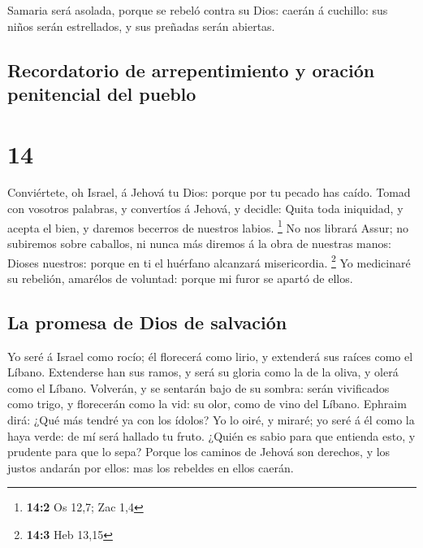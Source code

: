 Samaria será asolada, porque se rebeló contra su Dios:
caerán á cuchillo: sus niños serán estrellados, y sus preñadas serán
abiertas.

\hypertarget{recordatorio-de-arrepentimiento-y-oraciuxf3n-penitencial-del-pueblo}{%
\subsection{Recordatorio de arrepentimiento y oración penitencial del
pueblo}\label{recordatorio-de-arrepentimiento-y-oraciuxf3n-penitencial-del-pueblo}}

\hypertarget{section-13}{%
\section{14}\label{section-13}}

 Conviértete, oh Israel, á Jehová tu Dios: porque por tu
pecado has caído.  Tomad con vosotros palabras, y convertíos
á Jehová, y decidle: Quita toda iniquidad, y acepta el bien, y daremos
becerros de nuestros labios. \footnote{\textbf{14:2} Os 12,7; Zac 1,4}
 No nos librará Assur; no subiremos sobre caballos, ni nunca
más diremos á la obra de nuestras manos: Dioses nuestros: porque en ti
el huérfano alcanzará misericordia. \footnote{\textbf{14:3} Heb 13,15}
 Yo medicinaré su rebelión, amarélos de voluntad: porque mi
furor se apartó de ellos.

\hypertarget{la-promesa-de-dios-de-salvaciuxf3n}{%
\subsection{La promesa de Dios de
salvación}\label{la-promesa-de-dios-de-salvaciuxf3n}}

 Yo seré á Israel como rocío; él florecerá como lirio, y
extenderá sus raíces como el Líbano.  Extenderse han sus
ramos, y será su gloria como la de la oliva, y olerá como el Líbano.
 Volverán, y se sentarán bajo de su sombra: serán
vivificados como trigo, y florecerán como la vid: su olor, como de vino
del Líbano.  Ephraim dirá: ¿Qué más tendré ya con los
ídolos? Yo lo oiré, y miraré; yo seré á él como la haya verde: de mí
será hallado tu fruto.  ¿Quién es sabio para que entienda
esto, y prudente para que lo sepa? Porque los caminos de Jehová son
derechos, y los justos andarán por ellos: mas los rebeldes en ellos
caerán.
